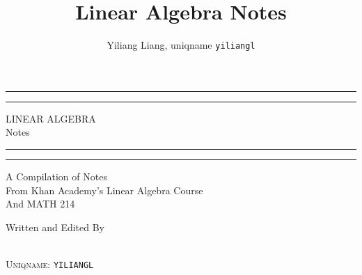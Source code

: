 \documentclass[]{book}
\title{Linear Algebra Notes}
\author{Yiliang Liang, uniqname \texttt{yiliangl} }
\date{}
\begin{document}
\begin{titlepage} %
	\centering %
	\scshape %
	
	\vspace*{5cm} %
	
	
	\rule{\textwidth}{1.6pt}\vspace*{-\baselineskip}\vspace*{2pt} %
	\rule{\textwidth}{0.4pt} %
	
	\vspace{0.75\baselineskip} %
	
	{\LARGE LINEAR ALGEBRA\\ Notes\\} %
	
	\vspace{0.75\baselineskip} %
	
	\rule{\textwidth}{0.4pt}\vspace*{-\baselineskip}\vspace{3.2pt} %
	\rule{\textwidth}{1.6pt} %
	
	\vspace{2\baselineskip} %
	
	
	A Compilation of Notes \\ From Khan Academy's Linear Algebra Course \\ And MATH 214%
	
	\vspace*{3\baselineskip} %
	
	
	Written and Edited By
	
	\vspace{0.5\baselineskip} %
	
	{\scshape\Large {} \\
	\small Uniqname: \texttt{YILIANGL}} %
	
	\vspace{0.5\baselineskip} %
	
	\textit{} %
\end{titlepage}
\end{document}
